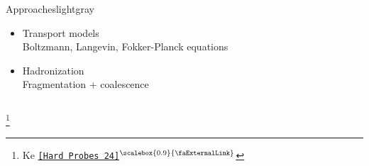 \documentclass[aspectratio=169,11pt,usenames,dvipsnames]{beamer}
\renewcommand{\thefootnote}{\color{customblue}\faPaperPlaneO}
\newcommand\blfootnote[1]{%
  \begingroup
  \renewcommand\thefootnote{}\footnote{#1}%
  \addtocounter{footnote}{-1}%
  \endgroup
}
\begin{document}
\begin{frame}
{\begin{columns}[onlytextwidth,t]
\begin{center}
\begin{custombox2transp}{\color{normal}Approaches}{lightgray}
\begin{varwidth}{0.85\textwidth}
\begin{itemize}
                        {\color{lightgray}\scriptsize FONLL and GM-VFNS at NLO+NLL accuracy}
                    \item {}Transport models\\[1pt]
                        {\color{lightgray}\scriptsize Boltzmann, Langevin, Fokker-Planck equations}
                    \item {}Hadronization\\[1pt]
                        {\color{lightgray}\scriptsize Fragmentation + coalescence}  
                \end{itemize}
                \end{varwidth}
            \end{custombox2transp}
            \end{center}
    \end{columns}}
    \begin{center}
        \vspace{-10pt}
    \end{center}
    \vspace{-5pt}    
    \blfootnote{\scriptsize Ke \href{https://indico.cern.ch/event/1339555/contributions/6038190/}{{\color{jyured}\texttt{[Hard Probes 24]$^\text{\scalebox{0.9}{\faExternalLink}}$}}}}
\end{frame}

\end{document}
